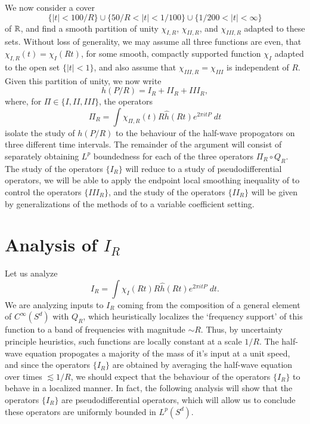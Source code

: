 We now consider a cover
%
\[ \{ |t| < 100/R \} \cup \{ 50/R < |t| < 1/100 \} \cup \{ 1/200 < |t| < \infty \} \]
%
of $\operatorname{\mathbb{R}}$, and find a smooth partition of unity $\chi_{I,R}$, $\chi_{II,R}$, and $\chi_{III,R}$ adapted to these sets. Without loss of generality, we may assume all three functions are even, that $\chi_{I,R}(t) = \chi_I(Rt)$, for some smooth, compactly supported function $\chi_I$ adapted to the open set $\{ |t| < 1 \}$, and also assume that $\chi_{III,R} = \chi_{III}$ is independent of $R$. Given this partition of unity, we now write
%
\[ h(P/R) = I_R + II_R + III_R, \]
%
where, for $\Pi \in \{ I, II, III \}$, the operators
%
\[ \Pi_R = \int \chi_{\Pi,R}(t) R \widehat{h}(Rt) e^{2 \pi i t P}\; dt \]
%
isolate the study of $h(P/R)$ to the behaviour of the half-wave propogators on three different time intervals. The remainder of the argument will consist of separately obtaining $L^p$ boundedness for each of the three operators $\Pi_R \circ Q_R$. The study of the operators $\{ I_R \}$ will reduce to a study of pseudodifferential operators, we will be able to apply the endpoint local smoothing inequality of \cite{LeeSeeger} to control the operators $\{ III_R \}$, and the study of the operators $\{ II_R \}$ will be given by generalizations of the methods of \cite{HeoandNazarovandSeeger} to a variable coefficient setting.




\section{Analysis of $I_R$}

Let us analyze
%
\[ I_R = \int \chi_I(Rt) R \widehat{h}(Rt) e^{2 \pi i t P}\; dt. \]
%
We are analyzing inputs to $I_R$ coming from the composition of a general element of $C^\infty(S^d)$ with $Q_R$, which heuristically localizes the `frequency support' of this function to a band of frequencies with magnitude $\sim R$. Thus, by uncertainty principle heuristics, such functions are locally constant at a scale $1/R$. The half-wave equation propogates a majority of the mass of it's input at a unit speed, and since the operators $\{ I_R \}$ are obtained by averaging the half-wave equation over times $\lesssim 1/R$, we should expect that the behaviour of the operators $\{ I_R \}$ to behave in a localized manner. In fact, the following analysis will show that the operators $\{ I_R \}$ are pseudodifferential operators, which will allow us to conclude these operators are uniformly bounded in $L^p(S^d)$.

